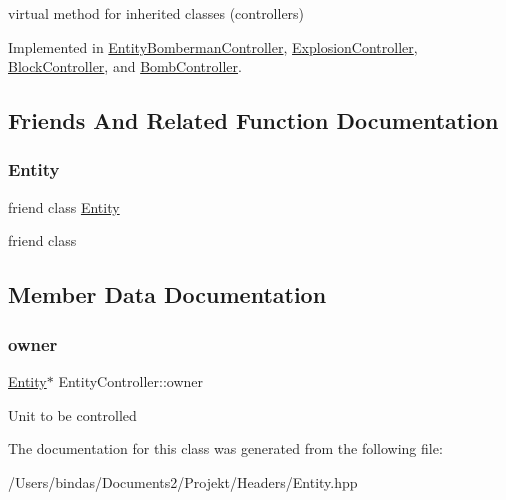 virtual method for inherited classes (controllers) 

Implemented in \mbox{\hyperlink{class_entity_bomberman_controller_a46f91e9853f7d9fcd7d01421221ffc66}{Entity\+Bomberman\+Controller}}, \mbox{\hyperlink{class_explosion_controller_ad67c33a4c9fc0f23c84266cb382500f1}{Explosion\+Controller}}, \mbox{\hyperlink{class_block_controller_a991f89cc93c19d0fe4188bca55e77d04}{Block\+Controller}}, and \mbox{\hyperlink{class_bomb_controller_ae84cb29af5b075c6802760105036abeb}{Bomb\+Controller}}.



\subsection{Friends And Related Function Documentation}
\mbox{\label{class_entity_controller_a614439ccac0344926adc4c0165d64060}} 
\subsubsection{\texorpdfstring{Entity}{Entity}}
{\footnotesize\ttfamily friend class \mbox{\hyperlink{class_entity}{Entity}}\hspace{0.3cm}{\ttfamily [friend]}}

friend class 

\subsection{Member Data Documentation}
\mbox{\label{class_entity_controller_ae1cec9b9d4305b346d4a4dd0965dd136}} 
\subsubsection{\texorpdfstring{owner}{owner}}
{\footnotesize\ttfamily \mbox{\hyperlink{class_entity}{Entity}}$\ast$ Entity\+Controller\+::owner\hspace{0.3cm}{\ttfamily [protected]}}

Unit to be controlled 

The documentation for this class was generated from the following file\+:\begin{DoxyCompactItemize}
\item 
/\+Users/bindas/\+Documents2/\+Projekt/\+Headers/Entity.\+hpp\end{DoxyCompactItemize}
